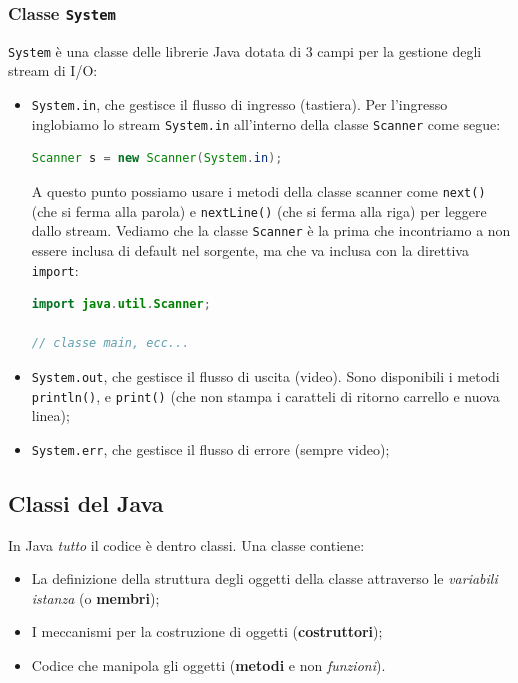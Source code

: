 \documentclass[a4paper,11pt]{article}
\begin{document}
\subsubsection{Classe \lstinline|System|}
\lstinline|System| è una classe delle librerie Java dotata di 3 campi per la gestione degli stream di I/O:
\begin{itemize}
	\item \lstinline|System.in|, che gestisce il flusso di ingresso (tastiera).
		Per l'ingresso inglobiamo lo stream \lstinline|System.in| all'interno della classe \lstinline|Scanner| come segue:
\begin{lstlisting}[language=java, style=codestyle]	
Scanner s = new Scanner(System.in);
\end{lstlisting}
A questo punto possiamo usare i metodi della classe scanner come \lstinline|next()| (che si ferma alla parola) e \lstinline|nextLine()| (che si ferma alla riga) per leggere dallo stream.
Vediamo che la classe \lstinline|Scanner| è la prima che incontriamo a non essere inclusa di default nel sorgente, ma che va inclusa con la direttiva \lstinline|import|:
\begin{lstlisting}[language=java, style=codestyle]	
import java.util.Scanner;

// classe main, ecc... 
\end{lstlisting}
	\item \lstinline|System.out|, che gestisce il flusso di uscita (video). Sono disponibili i metodi \lstinline|println()|, e \lstinline|print()| (che non stampa i caratteli di ritorno carrello e nuova linea);
	\item \lstinline|System.err|, che gestisce il flusso di errore (sempre video);
\end{itemize}

\subsection{Classi del Java}
In Java \textit{tutto} il codice è dentro classi.
Una classe contiene:
\begin{itemize}
	\item La definizione della struttura degli oggetti della classe attraverso le \textit{variabili istanza} (o \textbf{membri});
	\item I meccanismi per la costruzione di oggetti (\textbf{costruttori});
	\item Codice che manipola gli oggetti (\textbf{metodi} e non \textit{funzioni}).
\end{itemize}
\end{document}
